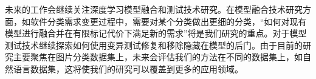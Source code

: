\documentclass[fontset=macnew,UTF8]{article} %
\begin{document}
未来的工作会继续关注深度学习模型融合和测试技术研究。在模型融合技术研究方面，如软件分类需求变更过程中，需要对某个分类做出更细的分类，“如何对现有模型进行融合并在有限标记代价下满足新的需求”将是我们研究的重点。对于模型测试技术继续探索如何使用变异测试修复和移除隐藏在模型的后门。由于目前的研究主要聚焦在图片分类数据集上，未来会评估我们的方法在不同的数据集上，如自然语言数据集，这将使我们的研究可以覆盖到更多的应用领域。

\end{document}
